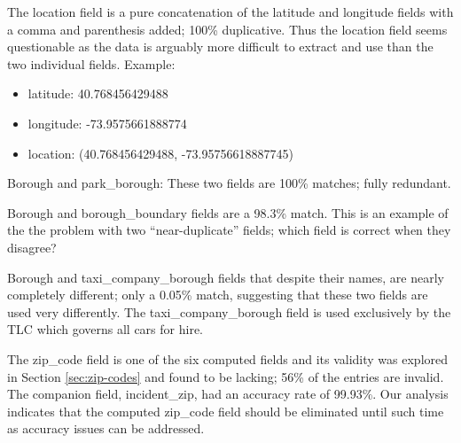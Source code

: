 \documentclass[12pt, titlepage]{article}
\begin{document}
\label{sec:latlong}
The location field is a pure concatenation of the latitude 
and longitude fields with a comma and parenthesis 
added; 100\% duplicative. Thus the  location field seems questionable 
as the data is arguably more difficult to extract and use than the 
two individual fields. Example:  


\begin{itemize}
	\item  latitude: 40.768456429488
	
	\item  longitude: -73.9575661888774
	
	\item  location: (40.768456429488, -73.95756618887745)
\end{itemize}


\label{sec:parkborough}
Borough and park\_borough: These two fields are 100\% matches; fully redundant.


\label{sec:boroughboundaries}
Borough and borough\_boundary fields are a 98.3\% match. This 
is an example of the the problem with two ``near-duplicate'' 
fields; which field is correct when they disagree?


\label{sec:taxicompanyborough}
Borough and taxi\_company\_borough fields that despite their 
names, are nearly completely different; only a 0.05\% match, suggesting
that these two fields are used very differently. The taxi\_company\_borough
 field is used exclusively by the TLC which governs all cars for hire.
 
 

 \label{sec:zipcodes}
 The zip\_code field is one of the six computed fields and its validity 
 was explored in Section \ref{sec:zip-codes} and found to be 
 lacking; 56\% of the entries are invalid. The companion 
 field, incident\_zip, had an accuracy rate of 99.93\%. Our analysis
 indicates that the computed zip\_code field should be eliminated
 until such time as accuracy issues can be addressed. 
\end{document}
